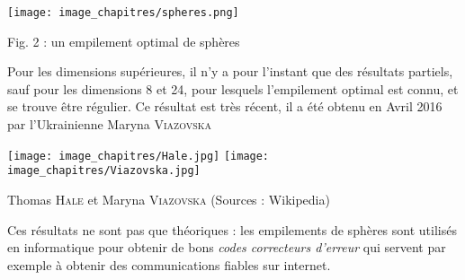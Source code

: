 \begin{His}
\begin{center}
\texttt{[image: image\_chapitres/spheres.png]} 

Fig. 2 : un empilement optimal de sphères
\end{center}


Pour les dimensions supérieures, il n'y a pour l'instant
que des résultats partiels, sauf pour les dimensions 8 et 24, pour
lesquels l'empilement optimal est connu, et se trouve être régulier.
Ce résultat est très récent, il a été obtenu en Avril 2016 par l'Ukrainienne
Maryna \textsc{Viazovska}


\begin{center}
\texttt{[image: image\_chapitres/Hale.jpg]} 
\hspace{2cm}
\texttt{[image: image\_chapitres/Viazovska.jpg]}

Thomas \textsc{Hale} et Maryna \textsc{Viazovska} (Sources : Wikipedia)
\end{center}


Ces résultats ne sont pas que théoriques : les empilements
de sphères sont utilisés en informatique pour obtenir de
bons {\em codes correcteurs d'erreur} qui servent par exemple
à obtenir des communications fiables sur internet. 

\end{His}
